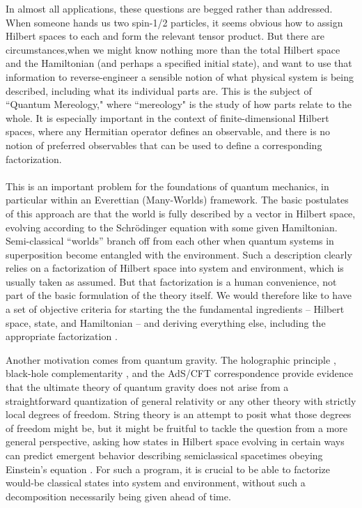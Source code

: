 \documentclass[aps,pra,onecolumn,nofootinbib,12pt,tightenlines]{revtex4-1}
\begin{document}
In almost all applications, these questions are begged rather than addressed.
When someone hands us two spin-1/2 particles, it seems obvious how to assign Hilbert spaces to each and form the relevant tensor product.
But there are circumstances,when we might know nothing more than the total Hilbert space and the Hamiltonian (and perhaps a specified initial state), and want to use that information to reverse-engineer a sensible notion of what physical system is being described, including what its individual parts are.
This is the subject of ``Quantum Mereology," where ``mereology" is the study of how parts relate to the whole.
It is especially important in the context of finite-dimensional Hilbert spaces, where any Hermitian operator defines an observable, and there is no notion of preferred observables that can be used to define a corresponding factorization.
\\
\\
{This is an important problem for the foundations of quantum mechanics, in particular within an Everettian (Many-Worlds) framework.
The basic postulates of this approach are that the world is fully described by a vector in Hilbert space, evolving according to the Schr\"odinger equation with some given Hamiltonian.
Semi-classical ``worlds'' branch off from each other when quantum systems in superposition become entangled with the environment.
Such a description clearly relies on a factorization of Hilbert space into system and environment, which is usually taken as assumed.
But that factorization is a human convenience, not part of the basic formulation of the theory itself.
We would therefore like to have a set of objective criteria for starting the the fundamental ingredients -- Hilbert space, state, and Hamiltonian -- and deriving everything else, including the appropriate factorization \cite{Carroll:2018rhc}.}

{Another motivation comes from quantum gravity.
The holographic principle \cite{Hooft:1993gx,Susskind:1994vu}, black-hole complementarity \cite{Susskind:1993if}, and the AdS/CFT correspondence \cite{Maldacena:1997re} provide evidence that the ultimate theory of quantum gravity does not arise from a straightforward quantization of general relativity or any other theory with strictly local degrees of freedom.
String theory is an attempt to posit what those degrees of freedom might be, but it might be fruitful to tackle the question from a more general perspective, asking how states in Hilbert space evolving in certain ways can predict emergent behavior describing semiclassical spacetimes obeying Einstein's equation \cite{Banks:2011av,Giddings:2015lla,Cao:2016mst,Cao:2017hrv}.
For such a program, it is crucial to be able to factorize would-be classical states into system and environment, without such a decomposition necessarily being given ahead of time.}
\end{document}
